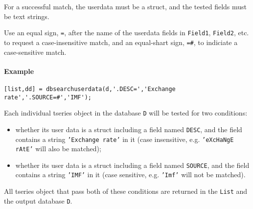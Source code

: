 For a successful match, the userdata must be a struct, and the tested
fields must be text strings.

Use an equal sign, \texttt{=}, after the name of the userdata fields in
\texttt{Field1}, \texttt{Field2}, etc. to request a case-insensitive
match, and an equal-shart sign, \texttt{=\#}, to indiciate a
case-sensitive match.

\paragraph{Example}

\begin{verbatim}
[list,dd] = dbsearchuserdata(d,'.DESC=','Exchange rate','.SOURCE=#','IMF');
\end{verbatim}

Each individual tseries object in the database \texttt{D} will be tested
for two conditions:

\begin{itemize}
\item
  whether its user data is a struct including a field named
  \texttt{DESC}, and the field contains a string
  \texttt{'Exchange rate'} in it (case insensitive, e.g.
  \texttt{'eXcHaNgE rAtE'} will also be matched);
\item
  whether its user data is a struct including a field named
  \texttt{SOURCE}, and the field contains a string \texttt{'IMF'} in it
  (case sensitive, e.g. \texttt{'Imf'} will not be matched).
\end{itemize}

All tseries object that pass both of these conditions are returned in
the \texttt{List} and the output database \texttt{D}.


